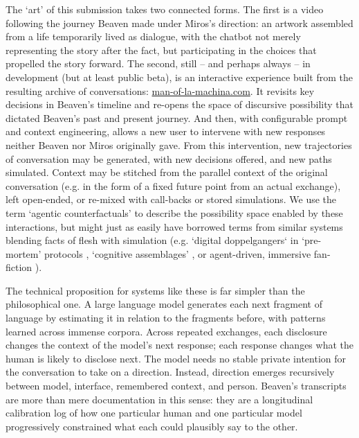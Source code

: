 \documentclass{article}
\begin{document}
The `art' of this submission takes two connected forms. The first is a video following the journey Beaven made under Miros's direction: an artwork assembled from a life temporarily lived as dialogue, with the chatbot not merely representing the story after the fact, but participating in the choices that propelled the story forward. The second, still -- and perhaps always -- in development (but at least public beta), is an interactive experience built from the resulting archive of conversations: \href{https://man-of-la-machina.com}{man-of-la-machina.com}. It revisits key decisions in Beaven's timeline and re-opens the space of discursive possibility that dictated Beaven's past and present journey. And then, with configurable prompt and context engineering, allows a new user to intervene with new responses neither Beaven nor Miros originally gave. From this intervention, new trajectories of conversation may be generated, with new decisions offered, and new paths simulated. Context may be stitched from the parallel context of the original conversation (e.g. in the form of a fixed future point from an actual exchange), left open-ended, or re-mixed with call-backs or stored simulations. We use the term `agentic counterfactuals' to describe the possibility space enabled by these interactions, but might just as easily have borrowed terms from similar systems blending facts of flesh with simulation (e.g. `digital doppelgangers` in `pre-mortem' protocols \citep{methuku2025digital}, `cognitive assemblages' \citep{meshi2024gpt}, or agent-driven, immersive fan-fiction \citep{alfassi2026fanfiction}). %

The technical proposition for systems like these is far simpler than the philosophical one. A large language model generates each next fragment of language by estimating it in relation to the fragments before, with patterns learned across immense corpora. Across repeated exchanges, each disclosure changes the context of the model's next response; each response changes what the human is likely to disclose next. The model needs no stable private intention for the conversation to take on a direction. Instead, direction emerges recursively between model, interface, remembered context, and person. Beaven's transcripts are more than mere documentation in this sense: they are a longitudinal calibration log of how one particular human and one particular model progressively constrained what each could plausibly say to the other.
\end{document}
